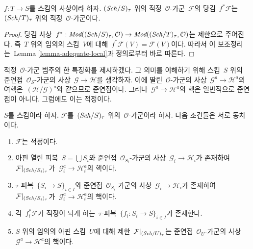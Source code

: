 \begin{lemma}
\label{lemma-pullback-adequate}
$f : T \to S$를 스킴의 사상이라 하자. $(\mathit{Sch}/S)_\tau$ 위의 적정\ 
$\mathcal{O}$-가군\  $\mathcal{F}$의 당김\  $f^*\mathcal{F}$는\ 
$(\mathit{Sch}/T)_\tau$ 위의 적정\  $\mathcal{O}$-가군이다.
\end{lemma}

\begin{proof}
당김 사상\ 
$f^* : \textit{Mod}((\mathit{Sch}/S)_\tau, \mathcal{O}) \to
\textit{Mod}((\mathit{Sch}/T)_\tau, \mathcal{O})$는 제한으로 주어진다.
즉\  $T$ 위의 임의의 스킴\  $V$에 대해\ 
$f^*\mathcal{F}(V) = \mathcal{F}(V)$이다. 따라서 이 보조정리는\ 
Lemma \ref{lemma-adequate-local}과 정의로부터 바로 따른다.
\end{proof}

\noindent
적정\  $\mathcal{O}$-가군 범주의 한 특징화를 제시하겠다. 그 의미를
이해하기 위해 스킴\  $S$ 위의 준연접\  $\mathcal{O}_S$-가군의 사상\ 
$\mathcal{G} \to \mathcal{H}$를 생각하자. 이에 딸린\ 
$\mathcal{O}$-가군의 사상\  $\mathcal{G}^a \to \mathcal{H}^a$의
여핵은\  $(\mathcal{H}/\mathcal{G})^a$와 같으므로 준연접이다.
그러나\  $\mathcal{G}^a \to \mathcal{H}^a$의 핵은 일반적으로
준연접이 아니다. 그럼에도 이는 적정이다.

\begin{lemma}
\label{lemma-adequate-characterize}
$S$를 스킴이라 하자. $\mathcal{F}$를\  $(\mathit{Sch}/S)_\tau$ 위의\ 
$\mathcal{O}$-가군이라 하자. 다음 조건들은 서로 동치이다.
\begin{enumerate}
\item $\mathcal{F}$는 적정이다.
\item 아핀 열린 피복\  $S = \bigcup S_i$와 준연접\ 
$\mathcal{O}_{S_i}$-가군의 사상\  $\mathcal{G}_i \to \mathcal{H}_i$가
존재하여\  $\mathcal{F}|_{(\mathit{Sch}/S_i)_\tau}$가\ 
$\mathcal{G}_i^a \to \mathcal{H}_i^a$의 핵이다.
\item $\tau$-피복\  $\{S_i \to S\}_{i \in I}$와 준연접\ 
$\mathcal{O}_{S_i}$-가군의 사상\  $\mathcal{G}_i \to \mathcal{H}_i$가
존재하여\  $\mathcal{F}|_{(\mathit{Sch}/S_i)_\tau}$가\ 
$\mathcal{G}_i^a \to \mathcal{H}_i^a$의 핵이다.
\item 각\  $f_i^*\mathcal{F}$가 적정이 되게 하는\  $\tau$-피복\ 
$\{f_i : S_i \to S\}_{i \in I}$가 존재한다.
\item $S$ 위의 임의의 아핀 스킴\  $U$에 대해 제한\ 
$\mathcal{F}|_{(\mathit{Sch}/U)_\tau}$는 준연접\  $\mathcal{O}_U$-가군의
사상\  $\mathcal{G}^a \to \mathcal{H}^a$의 핵이다.
\end{enumerate}
\end{lemma}

